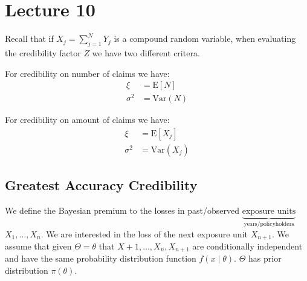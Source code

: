 \documentclass[english,12pt]{article}
\theoremstyle{plain}
\theoremstyle{definition}
\theoremstyle{definition} %
\newcommand{\ex}[1]{\mbox{E} \left[ #1 \right]}
\newcommand{\var}[1]{\mbox{Var} \left( #1 \right)}
\begin{document}
\section*{Lecture 10}
Recall that if $X_j=\sum\limits_{j=1}^NY_j$ is a compound random variable, when evaluating the credibility factor $Z$ we have two different critera.

For credibility on number of claims we have:
\begin{align*}
\xi&=\ex{N}\\
\sigma^2&=\var{N}
\end{align*}

For credibility on amount of claims we have:
\begin{align*}
\xi&=\ex{X_j}\\
\sigma^2&=\var{X_j}
\end{align*}

\subsection{Greatest Accuracy Credibility}
We define the Bayesian premium to the losses in past/observed $\underbrace{\text{exposure units}}_{\text{years/policyholders}}$ $X_1,\ldots,X_n$.  We are interested in the loss of the next exposure unit $X_{n+1}$.  We assume that given $\Theta=\theta$ that $X+1,\ldots,X_n,X_{n+1}$ are conditionally independent and have the same probability distribution function $f(x\mid\theta)$.  $\Theta$ has prior distribution $\pi(\theta)$.
\end{document}
